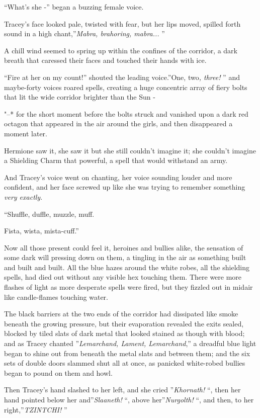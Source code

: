 ``What's she -'' began a buzzing female voice.

Tracey's face looked pale, twisted with fear, but her lips moved,
spilled forth sound in a high chant,''\emph{Mabra, brahoring,
mabra...} ''

A chill wind seemed to spring up within the confines of the corridor, a
dark breath that caressed their faces and touched their hands with ice.

``Fire at her on my count!'' shouted the leading voice.''One, two\emph{,
three!} '' and maybe-forty voices roared spells, creating a huge
concentric array of fiery bolts that lit the wide corridor brighter than
the Sun -

"--* for the short moment before the bolts struck and vanished upon a dark
red octagon that appeared in the air around the girls, and then
disappeared a moment later.

Hermione saw it, she saw it but she still couldn't imagine it; she
couldn't imagine a Shielding Charm that powerful, a spell that would
withstand an army.

And Tracey's voice went on chanting, her voice sounding louder and more
confident, and her face screwed up like she was trying to remember
something \emph{very exactly}.

``Shuffle, duffle, muzzle, muff.

Fista, wista, mista-cuff.''

Now all those present could feel it, heroines and bullies alike, the
sensation of some dark will pressing down on them, a tingling in the air
as something built and built and built. All the blue hazes around the
white robes, all the shielding spells, had died out without any visible
hex touching them. There were more flashes of light as more desperate
spells were fired, but they fizzled out in midair like candle-flames
touching water.

The black barriers at the two ends of the corridor had dissipated like
smoke beneath the growing pressure, but their evaporation revealed the
exits sealed, blocked by tiled slats of dark metal that looked stained
as though with blood; and as Tracey chanted ''\emph{Lemarchand, Lament,
Lemarchand},'' a dreadful blue light began to shine out from beneath the
metal slats and between them; and the six sets of double doors slammed
shut all at once, as panicked white-robed bullies began to pound on them
and howl.

Then Tracey's hand slashed to her left, and she cried ''\emph{Khornath!}
``, then her hand pointed below her and''\emph{Slaaneth!} ``, above
her''\emph{Nurgolth!} ``, and then, to her right,''\emph{TZINTCHI!} ''

